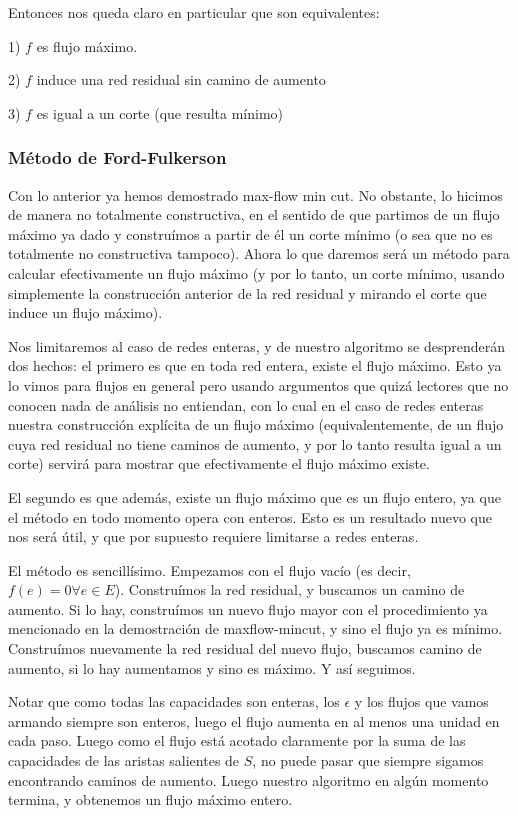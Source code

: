 \documentclass{article}
\begin{document}
Entonces nos queda claro en particular que son equivalentes:

1) $f$ es flujo máximo.

2) $f$ induce una red residual sin camino de aumento

3) $f$ es igual a un corte (que resulta mínimo)

\subsubsection{Método de Ford-Fulkerson}

Con lo anterior ya hemos demostrado max-flow min cut. No obstante, lo hicimos de manera no totalmente constructiva,
en el sentido de que partimos de un flujo máximo ya dado y construímos a partir de él un corte mínimo (o sea que no es
totalmente no constructiva tampoco). Ahora lo que daremos será un método para calcular efectivamente un flujo máximo
(y por lo tanto, un corte mínimo, usando simplemente la construcción anterior de la red residual y mirando el corte que
induce un flujo máximo). 

Nos limitaremos al caso de redes enteras, y de nuestro algoritmo se desprenderán dos hechos:
el primero es que en toda red entera, existe el flujo máximo. Esto ya lo vimos para flujos en general pero usando argumentos
que quizá lectores que no conocen nada de análisis no entiendan, con lo cual en el caso de redes enteras nuestra construcción
explícita de un flujo máximo (equivalentemente, de un flujo cuya red residual no tiene caminos de aumento, y por lo tanto
resulta igual a un corte) servirá para mostrar que efectivamente el flujo máximo existe. 

El segundo es que además, existe un flujo máximo que es un flujo entero, ya que el método en todo momento opera con enteros.
Esto es un resultado nuevo que nos será útil, y que por supuesto requiere limitarse a redes enteras.

El método es sencillísimo. Empezamos con el flujo vacío (es decir, $f(e) = 0 \forall e \in E$). Construímos la red residual, y
buscamos un camino de aumento. Si lo hay, construímos un nuevo flujo mayor con el procedimiento ya mencionado en la demostración
de maxflow-mincut, y sino el flujo ya es mínimo. Construímos nuevamente la red residual del nuevo flujo, buscamos camino de aumento,
si lo hay aumentamos y sino es máximo. Y así seguimos.

Notar que como todas las capacidades son enteras, los $\epsilon$ y los flujos que vamos armando siempre son enteros, luego el flujo
aumenta en al menos una unidad en cada paso. Luego como el flujo está acotado claramente por la suma de las capacidades de las aristas
salientes de $S$, no puede pasar que siempre sigamos encontrando caminos de aumento. Luego nuestro algoritmo en algún momento termina,
y obtenemos un flujo máximo entero.
\end{document}
